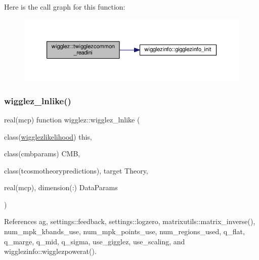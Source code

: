 Here is the call graph for this function\+:
\nopagebreak
\begin{figure}[H]
\begin{center}
\leavevmode
\includegraphics[width=350pt]{namespacewigglez_a0ccc7d6e7495d4d98fe5df0ae058145a_cgraph}
\end{center}
\end{figure}
\mbox{\label{namespacewigglez_abf254c63c44f0ccf748dd90a0814a664}} 
\subsubsection{\texorpdfstring{wigglez\+\_\+lnlike()}{wigglez\_lnlike()}}
{\footnotesize\ttfamily real(mcp) function wigglez\+::wigglez\+\_\+lnlike (\begin{DoxyParamCaption}\item[{class(\mbox{\hyperlink{structwigglez_1_1wigglezlikelihood}{wigglezlikelihood}})}]{this,  }\item[{class(cmbparams)}]{C\+MB,  }\item[{class(tcosmotheorypredictions), target}]{Theory,  }\item[{real(mcp), dimension(\+:)}]{Data\+Params }\end{DoxyParamCaption})\hspace{0.3cm}{\ttfamily [private]}}



References ag, settings\+::feedback, settings\+::logzero, matrixutils\+::matrix\+\_\+inverse(), num\+\_\+mpk\+\_\+kbands\+\_\+use, num\+\_\+mpk\+\_\+points\+\_\+use, num\+\_\+regions\+\_\+used, q\+\_\+flat, q\+\_\+marge, q\+\_\+mid, q\+\_\+sigma, use\+\_\+gigglez, use\+\_\+scaling, and wigglezinfo\+::wigglezpowerat().

